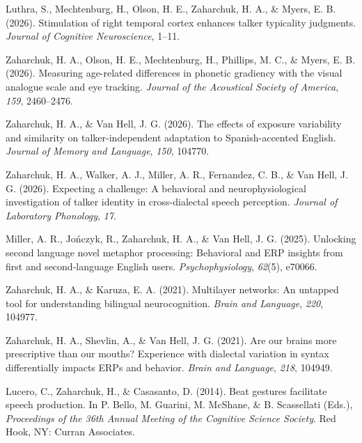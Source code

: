 \documentclass[11pt,a4paper,]{awesome-cv}
\newlength{\cslhangindent}
\newenvironment{CSLReferences}[2] %
 {\begin{list}{}{%
  \setlength{\itemindent}{0pt}
  \setlength{\leftmargin}{0pt}
  \setlength{\parsep}{0pt}
  \ifodd #1
   \setlength{\leftmargin}{\cslhangindent}
   \setlength{\itemindent}{-1\cslhangindent}
  \fi
  \setlength{\itemsep}{#2\baselineskip}}}
 {\end{list}}
\begin{document}
\label{refs-4feb4aa06c91195a4ba66ba2d10e899d}
\begin{CSLReferences}{1}{0}
Luthra, S., Mechtenburg, H., Olson, H. E., Zaharchuk, H. A., \& Myers,
E. B. (2026). Stimulation of right temporal cortex enhances talker
typicality judgments. \emph{Journal of Cognitive Neuroscience}, 1--11.

Zaharchuk, H. A., Olson, H. E., Mechtenburg, H., Phillips, M. C., \&
Myers, E. B. (2026). Measuring age-related differences in phonetic
gradiency with the visual analogue scale and eye tracking. \emph{Journal
of the Acoustical Society of America}, \emph{159}, 2460--2476.

Zaharchuk, H. A., \& Van Hell, J. G. (2026). The effects of exposure
variability and similarity on talker-independent adaptation to
Spanish-accented English. \emph{Journal of Memory and Language},
\emph{150}, 104770.

Zaharchuk, H. A., Walker, A. J., Miller, A. R., Fernandez, C. B., \& Van
Hell, J. G. (2026). Expecting a challenge: A behavioral and
neurophysiological investigation of talker identity in cross-dialectal
speech perception. \emph{Journal of Laboratory Phonology}, \emph{17}.

Miller, A. R., Jończyk, R., Zaharchuk, H. A., \& Van Hell, J. G. (2025).
Unlocking second language novel metaphor processing: Behavioral and ERP
insights from first and second‐language English users.
\emph{Psychophysiology}, \emph{62}(5), e70066.

Zaharchuk, H. A., \& Karuza, E. A. (2021). Multilayer networks: An
untapped tool for understanding bilingual neurocognition. \emph{Brain
and Language}, \emph{220}, 104977.

Zaharchuk, H. A., Shevlin, A., \& Van Hell, J. G. (2021). Are our brains
more prescriptive than our mouths? Experience with dialectal variation
in syntax differentially impacts ERPs and behavior. \emph{Brain and
Language}, \emph{218}, 104949.

Lucero, C., Zaharchuk, H., \& Casasanto, D. (2014). Beat gestures
facilitate speech production. In P. Bello, M. Guarini, M. McShane, \& B.
Scassellati (Eds.), \emph{Proceedings of the 36th Annual Meeting of the
Cognitive Science Society}. Red Hook, NY: Curran Associates.

\end{CSLReferences}
\end{document}
